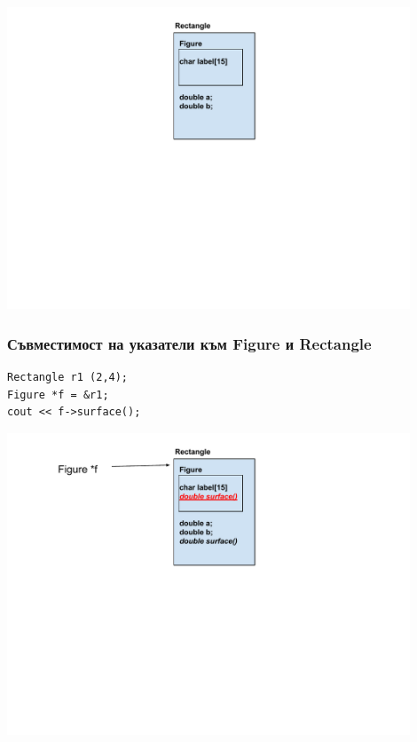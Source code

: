\documentclass{beamer}
\begin{document}
\begin{frame}[fragile]
\begin{columns}[t]
\begin{column}{0.5\textwidth}
  \end{column}
\end{columns}

\begin{center}
\includegraphics[width=12.0cm]{images/inmem_rectangle}
\end{center}


\end{frame}




\begin{frame}[fragile]
\frametitle{Съвместимост на указатели към Figure и Rectangle}


\begin{flushleft}
\begin{lstlisting}
Rectangle r1 (2,4);
Figure *f = &r1;
cout << f->surface();
\end{lstlisting}  
\end{flushleft}

\begin{center}
\includegraphics[width=12.0cm]{images/inmen_rect_withptr_r1}
\end{center}


\end{frame}
\end{document}
